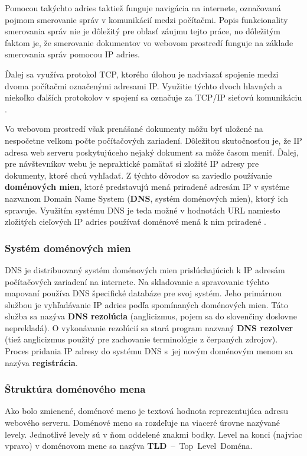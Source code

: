 Pomocou takýchto adries taktiež funguje navigácia na internete, označovaná pojmom smerovanie správ v komunikácií medzi počítačmi.
Popis funkcionality smerovania správ nie je dôležitý pre oblasť záujmu tejto práce, no dôležitým faktom je, 
že smerovanie dokumentov vo webovom prostredí funguje na základe smerovania správ pomocou IP adries.

Ďalej sa využíva protokol TCP, ktorého úlohou je nadviazať spojenie medzi dvoma počítačmi označenými adresami IP.
Využitie týchto dvoch hlavných a niekoľko ďalších protokolov v spojení sa označuje za TCP/IP sieťovú komunikáciu \cite{wiki-tcpip}.

Vo webovom prostredí však prenášané dokumenty môžu byť uložené na nespočetne veľkom počte počítačových zariadení.
Dôležitou skutočnosťou je, že IP adresa web serveru poskytujúceho nejaký dokument sa môže časom meniť.
Ďalej, pre návštevníkov webu je nepraktické pamätať si zložité IP adresy pre dokumenty, ktoré chcú vyhľadať.
Z týchto dôvodov sa zaviedlo používanie \textbf{doménových mien}, ktoré predstavujú mená priradené adresám IP v systéme nazvanom 
Domain Name System (\textbf{DNS}, systém doménových mien), ktorý ich spravuje. 
Využitím systému DNS je teda možné v hodnotách URL namiesto zložitých cieľových IP adries používať doménové mená k nim priradené \cite{cloudflare-dns}. 

\subsubsection{Systém doménových mien}

DNS je distribuovaný systém doménových mien prislúchajúcich k IP adresám počítačových zariadení na internete.
Na skladovanie a spravovanie týchto mapovaní používa DNS špecifické databáze pre svoj systém. 
Jeho primárnou službou je vyhľadávanie IP adries podľa spomínaných doménových mien.
Táto služba sa nazýva \textbf{DNS rezolúcia} (anglicizmus, pojem sa do slovenčiny doslovne neprekladá). 
O vykonávanie rezolúcií sa stará program nazvaný \textbf{DNS rezolver} \cite{cloudflare-dns} (tiež anglicizmus použitý pre zachovanie terminológie z čerpaných zdrojov).
Proces pridania IP adresy do systému DNS \mbox{s jej} novým doménovým menom sa nazýva \textbf{registrácia}.


\subsubsection{Štruktúra doménového mena}

Ako bolo zmienené, doménové meno je textová hodnota reprezentujúca adresu webového serveru.
Doménové meno sa rozdeľuje na viaceré úrovne nazývané levely. 
Jednotlivé levely sú v ňom oddelené znakmi bodky. 
Level na konci (najviac vpravo) v doménovom mene sa nazýva \mbox{\textbf{TLD} -- Top Level Doména}. 

